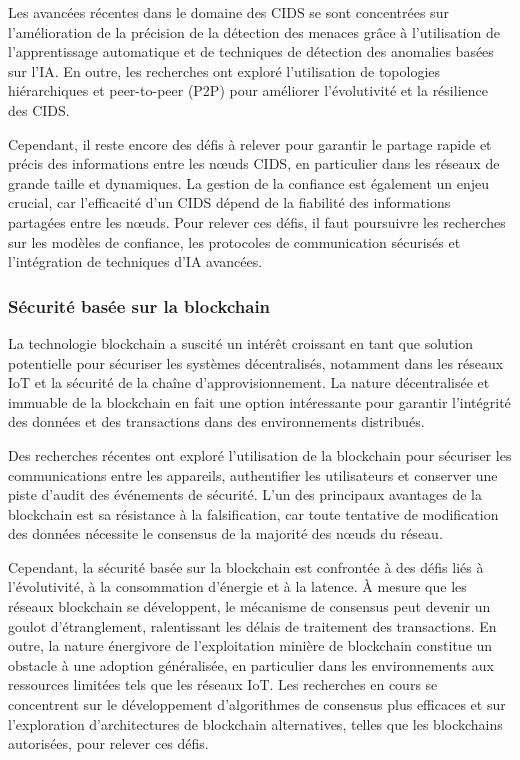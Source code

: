 Les avancées récentes dans le domaine des CIDS se sont concentrées sur l'amélioration de la précision de la détection des menaces grâce à l'utilisation de l'apprentissage automatique et de techniques de détection des anomalies basées sur l'IA. En outre, les recherches ont exploré l'utilisation de topologies hiérarchiques et peer-to-peer (P2P) pour améliorer l'évolutivité et la résilience des CIDS.

Cependant, il reste encore des défis à relever pour garantir le partage rapide et précis des informations entre les nœuds CIDS, en particulier dans les réseaux de grande taille et dynamiques. La gestion de la confiance est également un enjeu crucial, car l'efficacité d'un CIDS dépend de la fiabilité des informations partagées entre les nœuds. Pour relever ces défis, il faut poursuivre les recherches sur les modèles de confiance, les protocoles de communication sécurisés et l'intégration de techniques d'IA avancées.

\subsubsection{Sécurité basée sur la blockchain}

La technologie blockchain a suscité un intérêt croissant en tant que solution potentielle pour sécuriser les systèmes décentralisés, notamment dans les réseaux IoT et la sécurité de la chaîne d'approvisionnement. La nature décentralisée et immuable de la blockchain en fait une option intéressante pour garantir l'intégrité des données et des transactions dans des environnements distribués.

Des recherches récentes ont exploré l’utilisation de la blockchain pour sécuriser les communications entre les appareils, authentifier les utilisateurs et conserver une piste d’audit des événements de sécurité. L’un des principaux avantages de la blockchain est sa résistance à la falsification, car toute tentative de modification des données nécessite le consensus de la majorité des nœuds du réseau.

Cependant, la sécurité basée sur la blockchain est confrontée à des défis liés à l'évolutivité, à la consommation d'énergie et à la latence. À mesure que les réseaux blockchain se développent, le mécanisme de consensus peut devenir un goulot d'étranglement, ralentissant les délais de traitement des transactions. En outre, la nature énergivore de l'exploitation minière de blockchain constitue un obstacle à une adoption généralisée, en particulier dans les environnements aux ressources limitées tels que les réseaux IoT. Les recherches en cours se concentrent sur le développement d'algorithmes de consensus plus efficaces et sur l'exploration d'architectures de blockchain alternatives, telles que les blockchains autorisées, pour relever ces défis.

